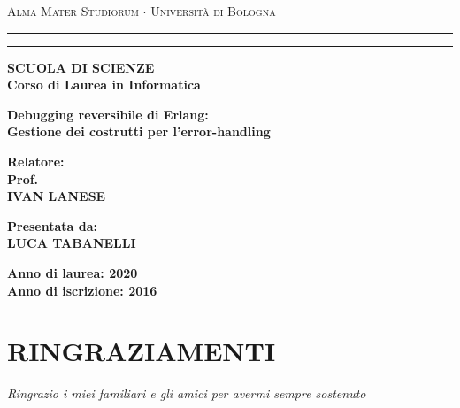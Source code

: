 \documentclass[a4paper,12pt]{article}
\begin{document}
\begin{titlepage}
\begin{center}
{{\Large{\textsc{Alma Mater Studiorum $\cdot$ Universit\`a di
Bologna}}}} \rule[0.1cm]{15.8cm}{0.1mm}
\rule[0.5cm]{15.8cm}{0.6mm}
{\small{\bf SCUOLA DI SCIENZE\\
Corso di Laurea in Informatica}}
\end{center}
\vspace{15mm}
\begin{center}
{\LARGE{\bf Debugging reversibile di Erlang:}}\\
\vspace{3mm}
{\LARGE{\bf Gestione dei costrutti per l'error-handling}}\\
\end{center}
\vspace{40mm}
\par
\noindent
\begin{minipage}[t]{0.47\textwidth}
{\large{\bf Relatore:\\
Prof.\\
IVAN LANESE}}
\end{minipage}
\hfill
\begin{minipage}[t]{0.47\textwidth}\raggedleft
{\large{\bf Presentata da:\\
LUCA TABANELLI}}
\end{minipage}
\vspace{20mm}
\begin{center}
{\large{\bf Anno di laurea: 2020\\%
Anno di iscrizione: 2016 }}%
\end{center}
\end{titlepage}
\tableofcontents
\clearpage




\section{RINGRAZIAMENTI}
\begin{center}
\begin{minipage}[t]{0.47\textwidth}\raggedright
{\large{\it Ringrazio i miei familiari e gli amici per avermi sempre sostenuto}}
\end{minipage}
\end{center}
\clearpage
\printbibliography
\end{document}
